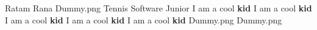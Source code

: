 \insertbio
{Ratam Rana}
{Dummy.png}
{Tennis}
{Software}
{Junior}
{
I am a cool \textbf{kid}
I am a cool \textbf{kid}
I am a cool \textbf{kid}
I am a cool \textbf{kid}
I am a cool \textbf{kid}
}
{Dummy.png}
{Dummy.png}

